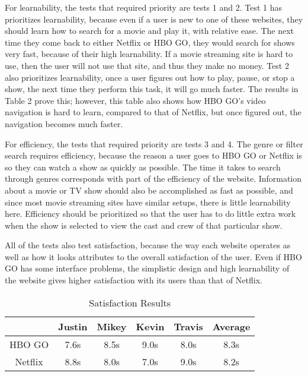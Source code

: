 \documentclass[11pt]{article}
\begin{document}
For learnability, the tests that required priority are tests 1 and 2. Test 1 has prioritizes learnability, because even if a user is new to one of these websites, they should learn how to search for a movie and play it, with relative ease. The next time they come back to either Netflix or HBO GO, they would search for shows very fast, because of their high learnability. If a movie streaming site is hard to use, then the user will not use that site, and thus they make no money. Test 2 also prioritizes learnability, once a user figures out how to play, pause, or stop a show, the next time they perform this task, it will go much faster. The results in Table 2 prove this; however, this table also shows how HBO GO's video navigation is hard to learn, compared to that of Netflix, but once figured out, the navigation becomes much faster.

For efficiency, the tests that required priority are tests 3 and 4. The genre or filter search requires efficiency, because the reason a user goes to HBO GO or Netflix is so they can watch a show as quickly as possible. The time it takes to search through genres corresponds with part of the efficiency of the website. Information about a movie or TV show should also be accomplished as fast as possible, and since most movie streaming sites have similar setups, there is little learnability here. Efficiency should be prioritized so that the user has to do little extra work when the show is selected to view the cast and crew of that particular show.

All of the tests also test satisfaction, because the way each website operates as well as how it looks attributes to the overall satisfaction of the user. Even if HBO GO has some interface problems, the simplistic design and high learnability of the website gives higher satisfaction with its users than that of Netflix.

\begin{table}[ht]
\caption{Satisfaction Results} 				%
\centering 									%
\begin{tabular}{|c|c c c c|c|} %
\hline\hline 									%
   &Justin& Mikey&Kevin&Travis&Average  \\ [0.5ex] 	    %
\hline 									    %
HBO GO  &7.6s & 8.5s&9.0s&8.0s&8.3s          \\			 %
\hline
Netflix &8.8s&8.0s&7.0s&9.0s&8.2s                             \\ [0.5ex]
\hline
\end{tabular}
\label{table:nonlin} %
\end{table}
\end{document}
